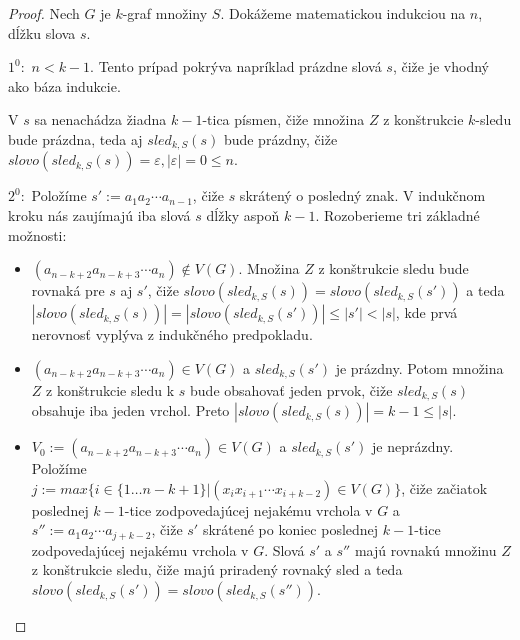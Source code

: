 \begin{proof}
    Nech $G$ je $k$-graf množiny $S$. Dokážeme matematickou indukciou na $n$, dĺžku slova $s$.

    $1^0:$  $n < k-1$. Tento prípad pokrýva napríklad prázdne slová $s$, čiže je vhodný ako báza indukcie.
            
            V $s$ sa nenachádza žiadna $k-1$-tica písmen, čiže množina $Z$ z konštrukcie $k$-sledu bude prázdna, teda aj $sled_{k,S}(s)$ bude
            prázdny, čiže $slovo (sled_{k,S}(s)) = \varepsilon, |\varepsilon| = 0 \leq n$.

    $2^0:$  Položíme $s' := a_1 a_2 \cdots a_{n-1}$, čiže $s$ skrátený o posledný znak. 
            V indukčnom kroku nás zaujímajú iba slová $s$ dĺžky aspoň $k - 1$. Rozoberieme tri základné možnosti:
            \begin{itemize}
                \item $(a_{n-k+2} a_{n-k+3} \cdots a_n) \notin V(G).$ Množina $Z$ z konštrukcie sledu bude rovnaká
                      pre $s$ aj $s'$, čiže $slovo(sled_{k,S}(s)) = slovo (sled_{k,S}(s'))$ a teda \\ 
                      $|slovo(sled_{k,S}(s))| = |slovo(sled_{k,S}(s'))| \leq |s'| < |s|$, kde prvá nerovnosť vyplýva z indukčného predpokladu.
                \item $(a_{n-k+2} a_{n-k+3} \cdots a_n) \in V(G)$ a $sled_{k,S}(s')$ je prázdny. Potom množina $Z$ z konštrukcie
                      sledu k $s$ bude obsahovať jeden prvok, čiže $sled_{k,S}(s)$ obsahuje iba jeden vrchol. Preto $|slovo(sled_{k,S}(s))| = k - 1 \leq |s|$.
                \item $V_0 := (a_{n-k+2} a_{n-k+3} \cdots a_n) \in V(G)$ a $sled_{k,S}(s')$ je neprázdny. Položíme \\
                      $j := max \{ i \in \{1 \ldots n - k + 1 \} | (x_i x_{i+1} \cdots x_{i+k-2}) \in V(G) \}$,
                      čiže začiatok poslednej $k-1$-tice zodpovedajúcej nejakému vrchola v $G$ a $s'' := a_1 a_2 \cdots a_{j+k-2}$,
                      čiže $s'$ skrátené po koniec poslednej $k-1$-tice zodpovedajúcej nejakému vrchola v $G$. Slová $s'$ a $s''$ majú
                      rovnakú množinu $Z$ z konštrukcie sledu, čiže majú priradený rovnaký sled a teda $slovo(sled_{k,S}(s')) = slovo(sled_{k,S}(s''))$.


\end{itemize}
\end{proof}
